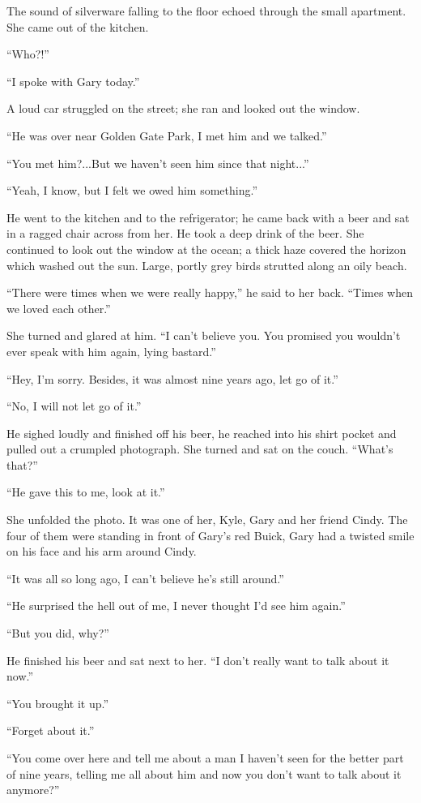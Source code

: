 The sound of silverware falling to the floor echoed through the small
apartment. She came out of the kitchen.

``Who?!''

``I spoke with Gary today.''

A loud car struggled on the street; she ran and looked out the window.

``He was over near Golden Gate Park, I met him and we talked.''

``You met him?...But we haven't seen him since that night...''

``Yeah, I know, but I felt we owed him something.''

He went to the kitchen and to the refrigerator; he came back with a beer
and sat in a ragged chair across from her. He took a deep drink of the
beer. She continued to look out the window at the ocean; a thick haze
covered the horizon which washed out the sun. Large, portly grey birds
strutted along an oily beach.

``There were times when we were really happy,'' he said to her back.
``Times when we loved each other.''

She turned and glared at him. ``I can't believe you. You promised you
wouldn't ever speak with him again, lying bastard.''

``Hey, I'm sorry. Besides, it was almost nine years ago, let go of it.''

``No, I will not let go of it.''

He sighed loudly and finished off his beer, he reached into his shirt
pocket and pulled out a crumpled photograph. She turned and sat on the
couch. ``What's that?''

``He gave this to me, look at it.''

She unfolded the photo. It was one of her, Kyle, Gary and her friend
Cindy. The four of them were standing in front of Gary's red Buick, Gary
had a twisted smile on his face and his arm around Cindy.

``It was all so long ago, I can't believe he's still around.''

``He surprised the hell out of me, I never thought I'd see him again.''

``But you did, why?''

He finished his beer and sat next to her. ``I don't really want to talk
about it now.''

``You brought it up.''

``Forget about it.''

``You come over here and tell me about a man I haven't seen for the
better part of nine years, telling me all about him and now you don't
want to talk about it anymore?''

